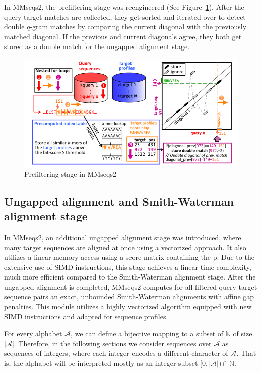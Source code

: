 \documentclass[twoside,a4paper,bsc]{master}
\newcommand{\Alpha}[0]{\mathcal{A}}
\newcommand{\Nats}{\mathbb{N}}
\begin{document}
In MMseqs2, the prefiltering stage was reengineered (See
Figure~\ref{fig:prefilterMMseqs2}). After the query-target matches are
collected, they get sorted and iterated over to detect double \(q\)-gram
matches
by comparing the current diagonal with the previously matched diagonal. If
the previous and current diagonals agree, they both get stored as a double
match for the ungapped alignment stage.
\begin{figure}[t]
\begin{center}
\includegraphics[scale=0.7]{graphics/MMseqs2_prefilter.png}
\end{center}
\caption{Prefiltering stage in MMseqs2~\cite{steinegger2017mmseqs2}}
\label{fig:prefilterMMseqs2}
\end{figure}
\subsection{Ungapped alignment and Smith-Waterman alignment stage}
In MMseqs2, an additional ungapped alignment stage was introduced, where
many target sequences are aligned at once using a vectorized approach. It
also utilizes a linear memory access using a score matrix containing the p.
Due to the extensive use of SIMD instructions, this stage achieves a linear
time complexity, much more efficient compared to the Smith-Waterman
alignment stage.
After the ungapped alignment is completed, MMseqs2 computes for all
filtered
query-target sequence pairs an exact, unbounded Smith-Waterman alignments
with affine gap penalties. This module utilizes a highly vectorized
algorithm
equipped with new SIMD instructions and adapted for sequence profiles.

For every alphabet \(\Alpha\), we can define a bijective mapping to a
subset
of \(\Nats\) of size \(|\Alpha|\). Therefore, in the
following sections we consider sequences over \(\Alpha\) as sequences of
integers, where each integer encodes a different character of \(\Alpha\).
That is, the alphabet will be interpreted mostly as an integer
subset \([0,|\mathcal{A}|)\cap \Nats\).
\end{document}
